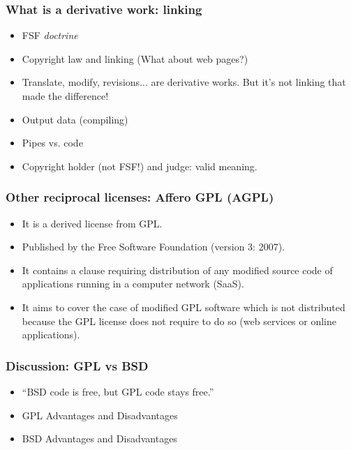 
\begin{frame}
\frametitle{What is a derivative work: linking}

\begin{itemize}
\item FSF \textit{doctrine}
\item Copyright law and linking (What about web pages?)
\item Translate, modify, revisions... are derivative works. But it's not linking that made the difference!
\item Output data (compiling)
\item Pipes vs. code
\item Copyright holder (not FSF!) and judge: valid meaning. 
\end{itemize}
\end{frame}




\begin{frame}
\frametitle{Other reciprocal licenses: Affero GPL (AGPL)}

\begin{itemize}
\item It is a \alert{derived} license from GPL. 
\item Published by the Free Software Foundation (version 3: 2007).
\item It contains a clause requiring distribution of any modified source code of applications \alert{running in a computer network} (SaaS).
\item It aims to cover the case of modified GPL software which is not distributed because the GPL license does not require to do so (web services or online applications). 
\end{itemize}
\end{frame}




\begin{frame}
\frametitle{Discussion: GPL vs BSD}


\begin{itemize}
\item ``BSD code is free, but GPL code stays free.'' 

\pause

\item GPL Advantages and Disadvantages

\pause

\item BSD Advantages and Disadvantages

\end{itemize}
\end{frame}





